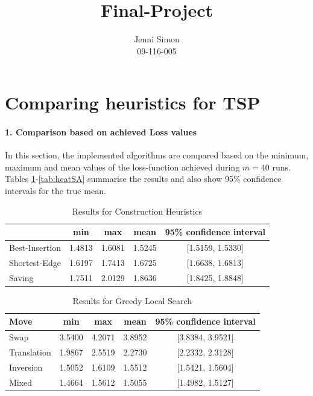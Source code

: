 \documentclass{paper}
\title{Final-Project}
\author{Jenni Simon\\09-116-005}
\begin{document}
\maketitle


%

\section*{Comparing heuristics for TSP}

\paragraph{1. Comparison based on achieved Loss values}

In this section, the implemented algorithms are compared based on the minimum, maximum and mean values of the loss-function achieved during $m=40$ runs. Tables \ref{tab:const}-\ref{tab:heatSA} summarise the results and also show 95\% confidence intervals for the true mean.


\begin{table}[!h]
\centering
\caption{Results for Construction Heuristics}
\label{tab:const}
\begin{tabular}{| l ||c|c|c|c|}
\hline
                       &  min & max & mean & 95\% confidence interval \\ \hline \hline
Best-Insertion &      1.4813   &      1.6081    &      1.5245     &      [1.5159,   1.5330]     \\  \hline 
Shortest-Edge  &    1.6197   &      1.7413    &      1.6725     &      [1.6638,   1.6813]      \\ \hline
Saving         &         1.7511   &      2.0129    &      1.8636     &      [1.8425,   1.8848]      \\ \hline
\end{tabular}
\end{table}

\begin{table}[!h]
\centering
\caption{Results for Greedy Local Search}
\label{tab:GLS}
\begin{tabular}{| l ||c|c|c|c|}
\hline
Move                  &  min & max & mean & 95\% confidence interval \\ \hline \hline
Swap              &      3.5400   &      4.2071    &      3.8952     &      [3.8384,   3.9521]     \\  \hline 
Translation       &    1.9867   &      2.5519    &      2.2730     &      [2.2332,   2.3128]      \\ \hline
Inversion     &         1.5052   &      1.6109    &      1.5512     &      [1.5421,   1.5604]      \\ \hline
Mixed          &         1.4664   &      1.5612    &      1.5055     &      [1.4982,   1.5127]      \\ \hline
\end{tabular}
\end{table}
\end{document}
